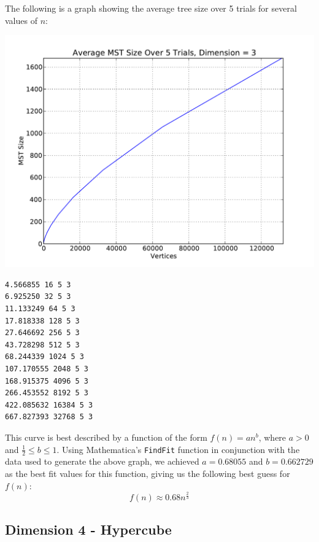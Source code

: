 \documentclass[solution, letterpaper]{cs121}
\begin{document}
The following is a graph showing the average tree size over 5 trials for several values of $n$:
\begin{center}
\includegraphics[scale=0.8]{graphs/kruskals-dimension-3.pdf}
\begin{verbatim}
4.566855 16 5 3
6.925250 32 5 3
11.133249 64 5 3
17.818338 128 5 3
27.646692 256 5 3
43.728298 512 5 3
68.244339 1024 5 3
107.170555 2048 5 3
168.915375 4096 5 3
266.453552 8192 5 3
422.085632 16384 5 3
667.827393 32768 5 3
\end{verbatim}
\end{center}

This curve is best described by a function of the form $f(n)=an^b$, where $a > 0$ and $\frac{1}{2} \leq b \leq 1$. Using Mathematica's {\tt FindFit} function in conjunction with the data used to generate the above graph, we achieved $a=0.68055$ and $b=0.662729$ as the best fit values for this function, giving us the following best guess for $f(n)$:
\[f(n) \approx 0.68n^{\frac{2}{3}}\]

\pagebreak
\subsection*{Dimension 4 - Hypercube}
\end{document}
